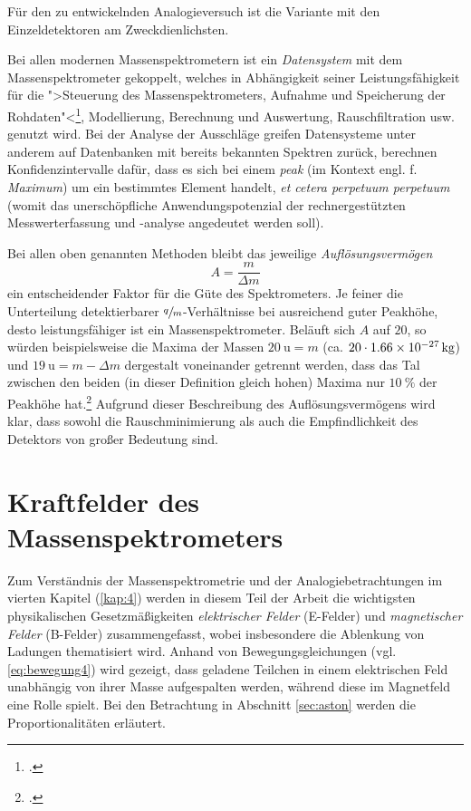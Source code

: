 \begin{items}
\begin{enumerate}
\end{enumerate}
Für den zu entwickelnden Analogieversuch ist die Variante mit den Einzeldetektoren am Zweckdienlichsten.
\item Bei allen modernen Massenspektrometern ist ein \textit{Datensystem} mit dem Massenspektrometer gekoppelt, welches in Abhängigkeit seiner Leistungsfähigkeit für die ">Steuerung des Massenspektrometers, Aufnahme und Speicherung der Rohdaten"<\footcite[S.\,51]{Budz2005}, Modellierung, Berechnung und Auswertung, Rauschfiltration usw. genutzt wird. Bei der Analyse der Ausschläge greifen Datensysteme unter anderem auf Datenbanken mit bereits bekannten Spektren zurück, berechnen Konfidenzintervalle dafür, dass es sich bei einem \textit{peak} (im Kontext engl. f. \textit{Maximum}) um ein bestimmtes Element handelt, \textit{et cetera perpetuum perpetuum} (womit das unerschöpfliche Anwendungspotenzial der rechnergestützten Messwerterfassung und -analyse angedeutet werden soll).  
\end{items}
Bei allen oben genannten Methoden bleibt das jeweilige \textit{Auflösungsvermögen}
\begin{equation}
\label{eq:aufloesung}
A = \frac{m}{\Delta m}
\end{equation}
ein entscheidender Faktor für die Güte des Spektrometers. Je feiner die Unterteilung detektierbarer $\sfrac{q}{m}$-Verhältnisse bei ausreichend guter Peakhöhe, desto leistungsfähiger ist ein Massenspektrometer. Beläuft sich $A$ auf $20$, so würden beispielsweise die Maxima der Massen $\SI{20}{\atomicmassunit} = m$ (ca. $20\cdot \SI{1.66E-27}{\kilo\gram}$) und $\SI{19}{\atomicmassunit}=m-\Delta m$ dergestalt voneinander getrennt werden, dass das Tal zwischen den beiden (in dieser Definition gleich hohen) Maxima nur $\SI{10}{\percent}$ der Peakhöhe hat.\footcite[vgl.][S.\,41]{Budz2005} Aufgrund dieser Beschreibung des Auflösungsvermögens wird klar, dass sowohl die Rauschminimierung als auch die Empfindlichkeit des Detektors von großer Bedeutung sind.


\section{Kraftfelder des Massenspektrometers}
\label{sec:force1}
Zum Verständnis der Massenspektrometrie und der Analogiebetrachtungen im vierten Kapitel (\ref{kap:4}) werden in diesem Teil der Arbeit die wichtigsten physikalischen Gesetzmäßigkeiten \textit{elektrischer Felder} (E-Felder) und \textit{magnetischer Felder} (B-Felder) zusammengefasst, wobei insbesondere die Ablenkung von Ladungen thematisiert wird. Anhand von Bewegungsgleichungen (vgl. \eqref{eq:bewegung4}) wird gezeigt, dass geladene Teilchen in einem elektrischen Feld unabhängig von ihrer Masse aufgespalten werden, während diese im Magnetfeld eine Rolle spielt. Bei den Betrachtung in Abschnitt \ref{sec:aston} werden die Proportionalitäten erläutert. 

